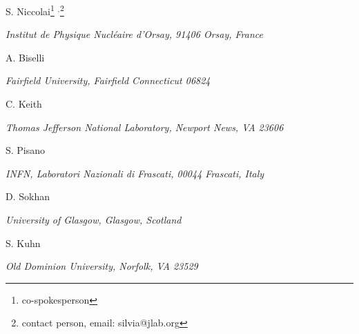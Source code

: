 \documentclass[12pt]{report}
\begin{document}
\vskip 0.5cm

\centerline{S. Niccolai\footnote{co-spokesperson} $^,$\footnote{contact person, email: silvia@jlab.org}}
\centerline{\it Institut de Physique Nucl\'eaire d'Orsay, 91406 Orsay, France}
\vskip 0.4cm
\centerline{A. Biselli\footnotemark[1]}
\centerline{\it Fairfield University, Fairfield Connecticut 06824}
\vskip 0.4cm
\centerline{C. Keith\footnotemark[1]}
\centerline{\it Thomas Jefferson National Laboratory, Newport News, VA 23606}
\vskip 0.4cm
\centerline{S. Pisano\footnotemark[1]}
\centerline{\it INFN, Laboratori Nazionali di Frascati, 00044 Frascati, Italy}
\vskip 0.4cm
\centerline{D. Sokhan\footnotemark[1]}
\centerline{\it University of Glasgow, Glasgow, Scotland}
\vskip 0.4cm
\centerline{S. Kuhn\footnotemark[1]}
\centerline{\it Old Dominion University, Norfolk, VA 23529}
\vskip 0.4cm
\newpage
\end{document}
